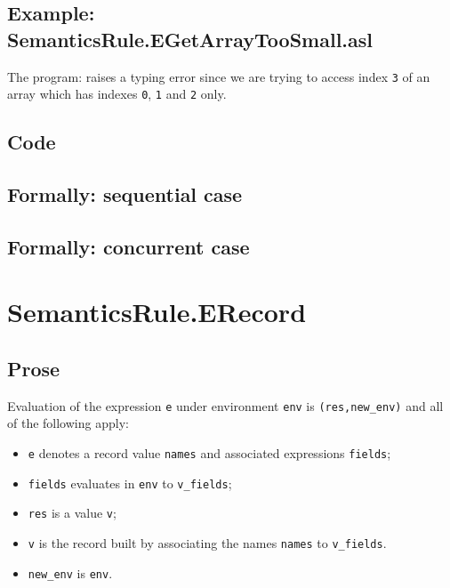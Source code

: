 \documentclass{book}
\begin{document}
  \subsection{Example: SemanticsRule.EGetArrayTooSmall.asl}
    The program:
    raises a typing error since we are trying to access index \texttt{3} of an array
    which has indexes \texttt{0}, \texttt{1} and \texttt{2} only.

  \subsection{Code}

\begin{emptyformal}
  \subsection{Formally: sequential case}

  \subsection{Formally: concurrent case}
\end{emptyformal}


\section{SemanticsRule.ERecord \label{sec:SemanticsRule.ERecord}}

  \subsection{Prose}
  Evaluation of the expression \texttt{e} under environment \texttt{env} is
  \texttt{(res,new\_env)} and all of the following apply:
  \begin{itemize}
  \item \texttt{e} denotes a record value \texttt{names} and associated expressions
    \texttt{fields};
  \item \texttt{fields} evaluates in \texttt{env} to \texttt{v\_fields};
  \item \texttt{res} is a value \texttt{v};
  \item \texttt{v} is the record built by associating the names \texttt{names} to \texttt{v\_fields}.
  \item \texttt{new\_env} is \texttt{env}.
  \end{itemize}
\end{document}
